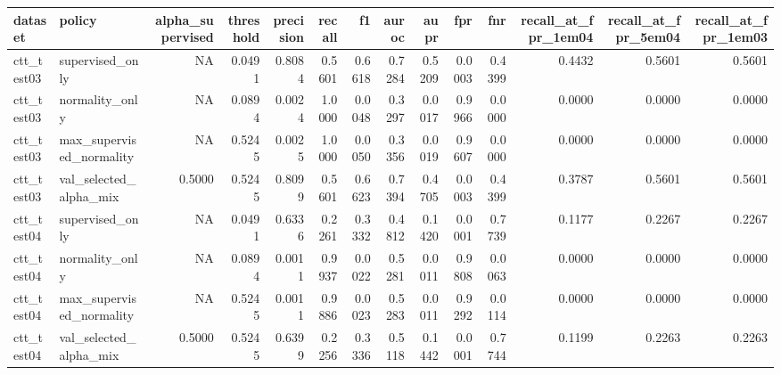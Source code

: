 \begin{tabular}{llrrrrrrrrrrrr}
\toprule
dataset & policy & alpha\_supervised & threshold & precision & recall & f1 & auroc & aupr & fpr & fnr & recall\_at\_fpr\_1em04 & recall\_at\_fpr\_5em04 & recall\_at\_fpr\_1em03 \\
\midrule
ctt\_test03 & supervised\_only & NA & 0.0491 & 0.8084 & 0.5601 & 0.6618 & 0.7284 & 0.5209 & 0.0003 & 0.4399 & 0.4432 & 0.5601 & 0.5601 \\
ctt\_test03 & normality\_only & NA & 0.0894 & 0.0024 & 1.0000 & 0.0048 & 0.3297 & 0.0017 & 0.9966 & 0.0000 & 0.0000 & 0.0000 & 0.0000 \\
ctt\_test03 & max\_supervised\_normality & NA & 0.5245 & 0.0025 & 1.0000 & 0.0050 & 0.3356 & 0.0019 & 0.9607 & 0.0000 & 0.0000 & 0.0000 & 0.0000 \\
ctt\_test03 & val\_selected\_alpha\_mix & 0.5000 & 0.5245 & 0.8099 & 0.5601 & 0.6623 & 0.7394 & 0.4705 & 0.0003 & 0.4399 & 0.3787 & 0.5601 & 0.5601 \\
ctt\_test04 & supervised\_only & NA & 0.0491 & 0.6336 & 0.2261 & 0.3332 & 0.4812 & 0.1420 & 0.0001 & 0.7739 & 0.1177 & 0.2267 & 0.2267 \\
ctt\_test04 & normality\_only & NA & 0.0894 & 0.0011 & 0.9937 & 0.0022 & 0.5281 & 0.0011 & 0.9808 & 0.0063 & 0.0000 & 0.0000 & 0.0000 \\
ctt\_test04 & max\_supervised\_normality & NA & 0.5245 & 0.0011 & 0.9886 & 0.0023 & 0.5283 & 0.0011 & 0.9292 & 0.0114 & 0.0000 & 0.0000 & 0.0000 \\
ctt\_test04 & val\_selected\_alpha\_mix & 0.5000 & 0.5245 & 0.6399 & 0.2256 & 0.3336 & 0.5118 & 0.1442 & 0.0001 & 0.7744 & 0.1199 & 0.2263 & 0.2263 \\
\bottomrule
\end{tabular}

